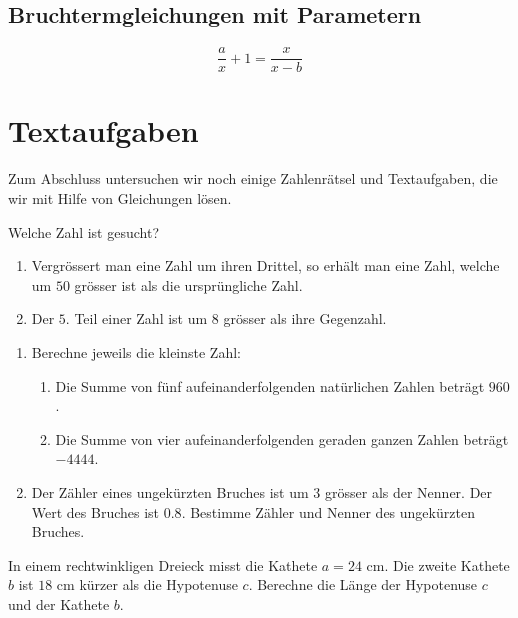 \documentclass[11pt,oneside]{article}
\begin{document}
\subsection{Bruchtermgleichungen mit Parametern}
	\begin{beispiel}
		\[\frac{a}{x}+1=\frac{x}{x-b}\]\vspace{5pt}
	\end{beispiel}


\newpage
\section{Textaufgaben}
	Zum Abschluss untersuchen wir noch einige Zahlenrätsel und Textaufgaben, die wir mit Hilfe von Gleichungen lösen.
	\begin{beispiel}
		Welche Zahl ist gesucht?
		\begin{enumerate}[label=\alph*)]
			\item Vergrössert man eine Zahl um ihren Drittel, so erhält man eine Zahl, welche um $50$ grösser ist als die ursprüngliche Zahl.
		\end{enumerate}
		\karos{5}
		\begin{enumerate}[label=\alph*)]
			\setcounter{enumi}{1}
			\item Der $5.$ Teil einer Zahl ist um $8$ grösser als ihre Gegenzahl.
		\end{enumerate}
		\karos{5}
	\end{beispiel}
	\begin{aufgabe}
		\begin{enumerate}
			\item Berechne jeweils die kleinste Zahl:
			\begin{enumerate}[label=\alph*)]
				\item Die Summe von fünf aufeinanderfolgenden natürlichen Zahlen beträgt $960$.
				\item Die Summe von vier aufeinanderfolgenden geraden ganzen Zahlen beträgt $-4444$.
			\end{enumerate}
			\item Der Zähler eines ungekürzten Bruches ist um $3$ grösser als der Nenner. Der Wert des Bruches ist $0.8$. Bestimme Zähler und Nenner des ungekürzten Bruches.
		\end{enumerate}
	\end{aufgabe}
	\newpage
	\begin{beispiel}
		In einem rechtwinkligen Dreieck misst die Kathete $a=24$ cm. Die zweite Kathete $b$ ist $18$ cm kürzer als die Hypotenuse $c$. Berechne die Länge der Hypotenuse $c$ und der Kathete $b$.\vspace{5pt}\newline\karos{9}
	\end{beispiel}
\end{document}
